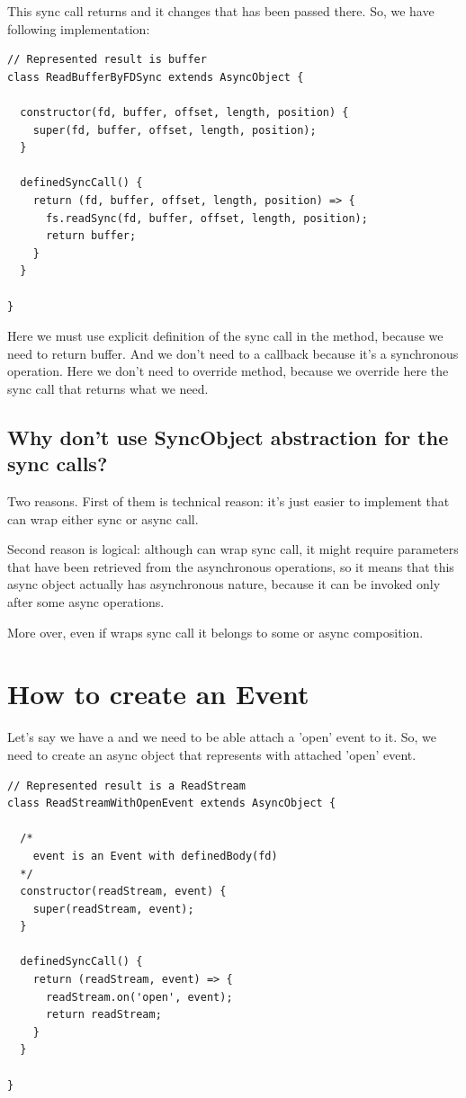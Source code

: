 \documentclass{article}
\newcommand{\cit}[1]{{\fontfamily{qcr}\selectfont{\textcolor{superdarkgray}{#1}}}}
\begin{document}
This sync call returns \cit{bytesRead} and it changes \cit{buffer} that has been passed there. So, we have following implementation:

\begin{lstlisting}
// Represented result is buffer
class ReadBufferByFDSync extends AsyncObject {

  constructor(fd, buffer, offset, length, position) {
    super(fd, buffer, offset, length, position);
  }

  definedSyncCall() {
    return (fd, buffer, offset, length, position) => {
      fs.readSync(fd, buffer, offset, length, position);
      return buffer;
    }
  }

}
\end{lstlisting}

Here we must use explicit definition of the sync call in the \cit{definedSyncCall} method, because we need to return buffer. And we don't need to a callback because it's a synchronous operation. Here we don't need to override \cit{onResult} method, because we override here the sync call that returns what we need.

\subsection{Why don't use SyncObject abstraction for the sync calls?}

Two reasons. First of them is technical reason: it's just easier to implement \cit{AsyncObject} that can wrap either sync or async call. 

Second reason is logical: although \cit{AsyncObject} can wrap sync call, it might require parameters that have been retrieved from the asynchronous operations, so it means that this async object actually has asynchronous nature, because it can be invoked only after some async operations.

More over, even if \cit{AsyncObject} wraps sync call it belongs to some \cit{AsyncTree} or async composition.

\section{How to create an Event}

Let's say we have a \cit{ReadStream} and we need to be able attach a 'open' event to it. So, we need to create an async object \cit{ReadStreamWithOpenEvent} that represents \cit{ReadStream} with attached 'open' event.

\begin{lstlisting}
// Represented result is a ReadStream
class ReadStreamWithOpenEvent extends AsyncObject {

  /*
    event is an Event with definedBody(fd)
  */
  constructor(readStream, event) {
    super(readStream, event);
  }

  definedSyncCall() {
    return (readStream, event) => {
      readStream.on('open', event);
      return readStream;
    }
  }

}
\end{lstlisting}
\end{document}
